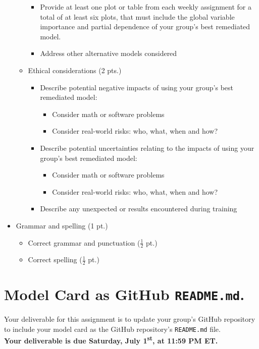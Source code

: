 \documentclass[fleqn]{article}
\begin{document}
\begin{itemize}
\begin{itemize}
\begin{itemize}
			\item Provide at least one plot or table from each weekly assignment for a total of at least six plots, that must include the global variable importance and partial dependence of your group's best remediated model.
			\item Address other alternative models considered
		\end{itemize}
		\item Ethical considerations (2 pts.)
		\begin{itemize}
			\item Describe potential negative impacts of using your group's best remediated model: 
			\begin{itemize}
			\item Consider math or software problems
			\item Consider real-world risks: who, what, when and how?
			\end{itemize}
			\item Describe potential uncertainties relating to the impacts of using your group's best remediated model:
			\begin{itemize} 
				\item Consider math or software problems
				\item Consider real-world risks: who, what, when and how?
			\end{itemize}
			\item Describe any unexpected or results encountered during training
		\end{itemize}
	\end{itemize}
	\item Grammar and spelling (1 pt.)
	\begin{itemize} 
		\item Correct grammar and punctuation ($\frac{1}{2}$ pt.)
		\item Correct spelling ($\frac{1}{2}$ pt.)
	\end{itemize}
\end{itemize}


\section{Model Card as GitHub \texttt{README.md}.}

Your deliverable for this assignment is to update your group's GitHub repository to include your model card as the GitHub repository's \texttt{README.md} file.\\

\noindent \textbf{Your deliverable is due Saturday, July 1\textsuperscript{st}, at 11:59 PM ET.}\\
\end{document}
